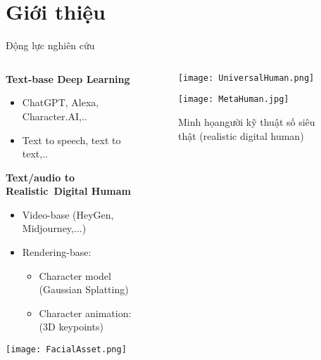 \section{Giới thiệu}

\begin{frame}{Động lực nghiên cứu}
	\vspace{5pt}
	
	\begin{columns}
	\begin{column}{0.7\textwidth}
		\textbf{Text-base Deep Learning}
		\begin{itemize}
			\item ChatGPT, Alexa, Character.AI,..
			\item Text to speech, text to text,..
		\end{itemize}
		
		\textbf{Text/audio to Realistic Digital Humam}
		
		\begin{itemize}
			\item Video-base (HeyGen, Midjourney,...)
			\item Rendering-base:
			\begin{itemize}
				\item Character model (Gaussian Splatting)
				\item Character animation: (3D keypoints)
			\end{itemize}
		\end{itemize}
		\vspace{5pt}
		\centering
		\texttt{[image: FacialAsset.png]}
	\end{column}
	
	\begin{column}{0.3\textwidth}
		\begin{figure}
				\texttt{[image: UniversalHuman.png]}
		\end{figure}
		
		\begin{figure}
			\texttt{[image: MetaHuman.jpg]}
			\caption{\small Minh họangười kỹ thuật số siêu thật (realistic digital human)}
		\end{figure}
	
	\end{column}
	
	\end{columns}
\end{frame}


